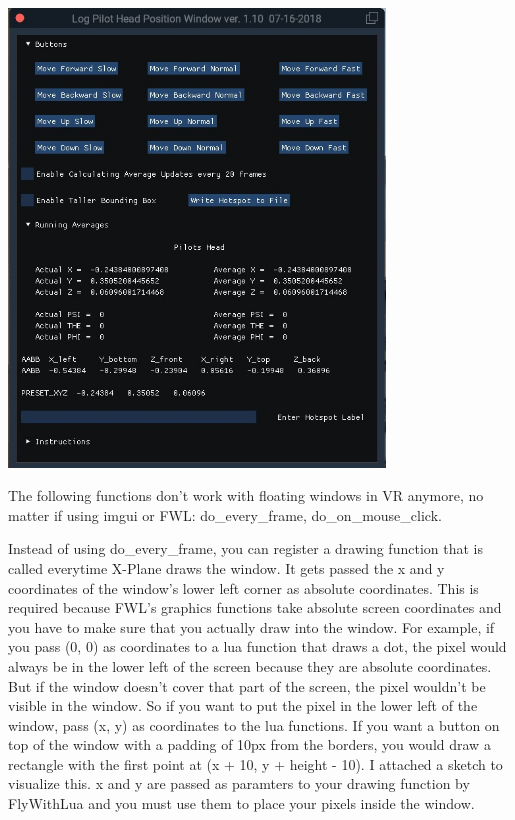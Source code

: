 \documentclass[11pt,parskip=half,a4paper]{scrartcl}
\begin{document}
\begin{center}
\includegraphics[width=10cm]{LogPilotHeadPosition.jpg}
\end{center}

\newpage
The following functions don't work with floating windows in VR anymore, no matter if using imgui or FWL: do\_every\_frame, do\_on\_mouse\_click.

Instead of using do\_every\_frame, you can register a drawing function that is called everytime X-Plane
draws the window. It gets passed the x and y coordinates of the window's lower left corner as absolute
coordinates. This is required because FWL's graphics functions take absolute screen coordinates and
you have to make sure that you actually draw into the window. For example, if you pass (0, 0) as
coordinates to a lua function that draws a dot, the pixel would always be in the lower left of
the screen because they are absolute coordinates. But if the window doesn't cover that part of the
screen, the pixel wouldn't be visible in the window. So if you want to put the pixel in the lower left of
the window, pass (x, y) as coordinates to the lua functions. If you want a button on top of the window
with a padding of 10px from the borders, you would draw a rectangle with the first point at (x + 10, y +
height - 10). I attached a sketch to visualize this. x and y are passed as paramters to your drawing
function by FlyWithLua and you must use them to place your pixels inside the window.
\end{document}
